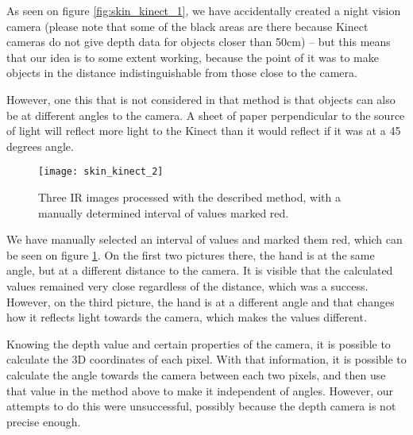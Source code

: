             As seen on figure \ref{fig:skin_kinect_1}, we have accidentally created
            a night vision camera (please note that some of the black areas are there because Kinect cameras do not give depth data for objects closer than 50cm)
            -- but this means that our idea is to some extent working, because the point
            of it was to make objects in the distance indistinguishable from those close
            to the camera.

            However, one this that is not considered in that method is that objects
            can also be at different angles to the camera.
            A sheet of paper perpendicular to the source of light will reflect more
            light to the Kinect than it would reflect if it was at a 45 degrees angle.

            \begin{figure}[H]
                \caption{Three IR images processed with the described method, with a
                manually determined interval of values marked red.}
                \centering
                \texttt{[image: skin\_kinect\_2]}
                \label{fig:skin_kinect_2}
            \end{figure}

            We have manually selected an interval of values and marked them red, which
            can be seen on figure \ref{fig:skin_kinect_2}.
            On the first two pictures there, the hand is at the same angle, but at a
            different distance to the camera.
            It is visible that the calculated values remained very close regardless
            of the distance, which was a success.
            However, on the third picture, the hand is at a different angle and
            that changes how it reflects light towards the camera, which makes the values
            different.

            Knowing the depth value and certain properties of the camera, it is possible
            to calculate the 3D coordinates of each pixel.
            With that information, it is possible to calculate the angle towards the
            camera between each two pixels, and then use that value in the method above
            to make it independent of angles.
            However, our attempts to do this were unsuccessful, possibly because the
            depth camera is not precise enough.

